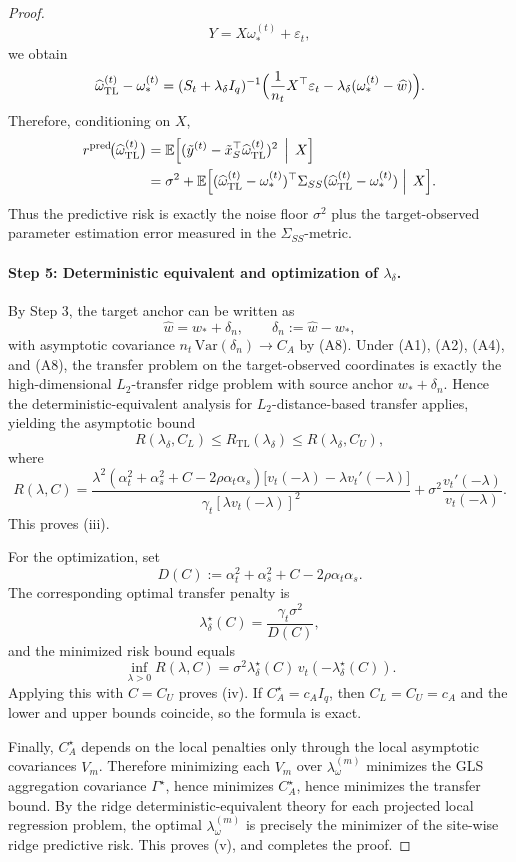 \documentclass[11pt]{article}
\newcommand{\1}{\mathbf{1}}
\begin{document}
\begin{proof}
\[
Y=X\omega_*^{(t)}+\varepsilon_t,
\]
we obtain
\[
\widehat\omega_{\mathrm{TL}}^{(t)}-\omega_*^{(t)}
=
(S_t+\lambda_\delta I_q)^{-1}
\Bigl(
\frac1{n_t}X^\top\varepsilon_t
-\lambda_\delta(\omega_*^{(t)}-\widehat w)
\Bigr).
\]
Therefore, conditioning on \(X\),
\begin{align*}
r^{\mathrm{pred}}\!\bigl(\widehat\omega_{\mathrm{TL}}^{(t)}\bigr)
&=
\mathbb E\Bigl[(\tilde y^{(t)}-\tilde x_S^\top\widehat\omega_{\mathrm{TL}}^{(t)})^2\,\Bigm|\,X\Bigr]\\
&=
\sigma^2+
\mathbb E\Bigl[
(\widehat\omega_{\mathrm{TL}}^{(t)}-\omega_*^{(t)})^\top
\Sigma_{SS}
(\widehat\omega_{\mathrm{TL}}^{(t)}-\omega_*^{(t)})
\Bigm|\,X
\Bigr].
\end{align*}
Thus the predictive risk is exactly the noise floor \(\sigma^2\) plus the target-observed
parameter estimation error measured in the \(\Sigma_{SS}\)-metric.

\paragraph{Step 5: Deterministic equivalent and optimization of \(\lambda_\delta\).}
By Step 3, the target anchor can be written as
\[
\widehat w = w_* + \delta_n,
\qquad
\delta_n:=\widehat w-w_*,
\]
with asymptotic covariance \(n_t\,\mathrm{Var}(\delta_n)\to C_A\) by (A8).
Under (A1), (A2), (A4), and (A8), the transfer problem on the target-observed coordinates
is exactly the high-dimensional \(L_2\)-transfer ridge problem with source anchor \(w_*+\delta_n\).
Hence the deterministic-equivalent analysis for \(L_2\)-distance-based transfer applies,
yielding the asymptotic bound
\[
R(\lambda_\delta,C_L)\le R_{\mathrm{TL}}(\lambda_\delta)\le R(\lambda_\delta,C_U),
\]
where
\[
R(\lambda,C)
=
\frac{\lambda^2(\alpha_t^2+\alpha_s^2+C-2\rho\alpha_t\alpha_s)
\bigl[v_t(-\lambda)-\lambda v_t'(-\lambda)\bigr]}
{\gamma_t[\lambda v_t(-\lambda)]^2}
+
\sigma^2\frac{v_t'(-\lambda)}{v_t(-\lambda)}.
\]
This proves (iii).

For the optimization, set
\[
D(C):=\alpha_t^2+\alpha_s^2+C-2\rho\alpha_t\alpha_s.
\]
The corresponding optimal transfer penalty is
\[
\lambda_\delta^\star(C)=\frac{\gamma_t\sigma^2}{D(C)},
\]
and the minimized risk bound equals
\[
\inf_{\lambda>0}R(\lambda,C)=\sigma^2\lambda_\delta^\star(C)\,v_t(-\lambda_\delta^\star(C)).
\]
Applying this with \(C=C_U\) proves (iv). If \(C_A^\star=c_A I_q\), then \(C_L=C_U=c_A\)
and the lower and upper bounds coincide, so the formula is exact.

Finally, \(C_A^\star\) depends on the local penalties only through the local asymptotic
covariances \(V_m\). Therefore minimizing each \(V_m\) over \(\lambda_\omega^{(m)}\) minimizes
the GLS aggregation covariance \(\Gamma^\star\), hence minimizes \(C_A^\star\), hence minimizes
the transfer bound. By the ridge deterministic-equivalent theory for each projected local
regression problem, the optimal \(\lambda_\omega^{(m)}\) is precisely the minimizer of the
site-wise ridge predictive risk. This proves (v), and completes the proof.
\end{proof}
\end{document}
